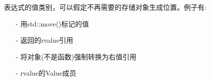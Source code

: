 



表达式的值类别，可以假定不再需要的存储对象生成位置。例子有:

\begin{itemize}
\item [-]
用std::move()标记的值

\item [-]
返回的rvalue引用

\item [-]
将对象(不是函数)强制转换为右值引用

\item [-]
rvalue的Value成员
\end{itemize}














